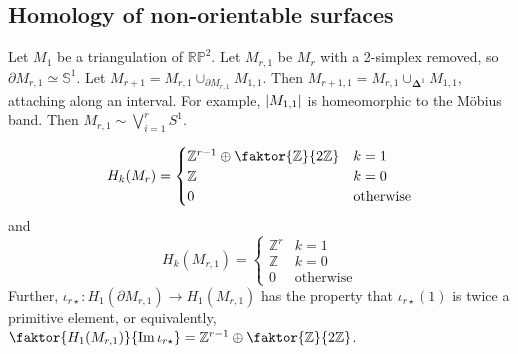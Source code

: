 \subsection{Homology of non-orientable surfaces}
Let \( M_1 \) be a triangulation of \( \mathbb R \mathbb P^2 \).
Let \( M_{r,1} \) be \( M_r \) with a 2-simplex removed, so \( \partial M_{r,1} \simeq \mathbb S^1 \).
Let \( M_{r+1} = M_{r,1} \cup_{\partial M_{r,1}} M_{1,1} \).
Then \( M_{r+1,1} = M_{r,1} \cup_{\bm\Delta^1} M_{1,1} \), attaching along an interval.
For example, \( \abs{M_{1,1}} \) is homeomorphic to the M\"obius band.
Then \( M_{r,1} \sim \bigvee_{i=1}^r S^1 \).
\begin{proposition}
	\[ H_k(M_r) = \begin{cases}
		\mathbb Z^{r-1} \oplus \faktor{\mathbb Z}{2\mathbb Z} & k = 1 \\
		\mathbb Z & k = 0 \\
		0 & \text{otherwise}
	\end{cases} \]
	and
	\[ H_k(M_{r,1}) = \begin{cases}
		\mathbb Z^r & k = 1 \\
		\mathbb Z & k = 0 \\
		0 & \text{otherwise}
	\end{cases} \]
	Further, \( \iota_{r\star} \colon H_1(\partial M_{r,1}) \to H_1(M_{r,1}) \) has the property that \( \iota_{r\star}(1) \) is twice a primitive element, or equivalently, \( \faktor{H_1(M_{r,1})}{\Im \iota_{r\star}} = \mathbb Z^{r-1} \oplus \faktor{\mathbb Z}{2\mathbb Z} \).
\end{proposition}
